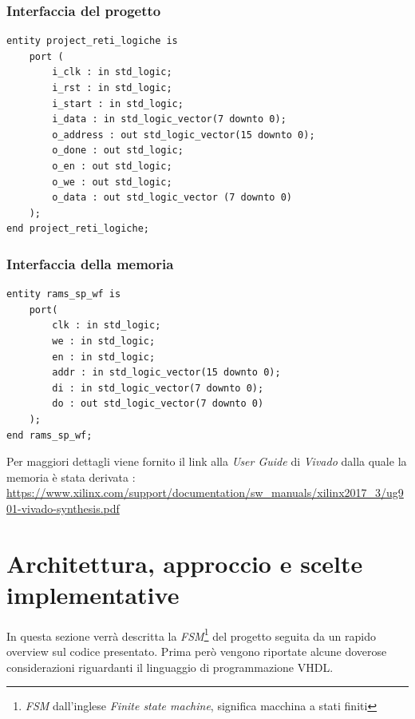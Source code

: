 \documentclass[11pt,a4paper]{article}
\begin{document}
        \subsubsection{Interfaccia del progetto}
            \begin{verbatim}
entity project_reti_logiche is
    port (
        i_clk : in std_logic;
        i_rst : in std_logic;
        i_start : in std_logic;
        i_data : in std_logic_vector(7 downto 0);
        o_address : out std_logic_vector(15 downto 0);
        o_done : out std_logic;
        o_en : out std_logic;
        o_we : out std_logic;
        o_data : out std_logic_vector (7 downto 0)
    );
end project_reti_logiche;
            \end{verbatim}
        \newpage
        \subsubsection{Interfaccia della memoria}
            \begin{verbatim}
entity rams_sp_wf is
    port(
        clk : in std_logic;
        we : in std_logic;
        en : in std_logic;
        addr : in std_logic_vector(15 downto 0);
        di : in std_logic_vector(7 downto 0);
        do : out std_logic_vector(7 downto 0)
    );
end rams_sp_wf;
            \end{verbatim}
            Per maggiori dettagli viene fornito il link alla \textit{User Guide} di \textit{Vivado} dalla quale la memoria è stata derivata : \footnotesize{\url{https://www.xilinx.com/support/documentation/sw\_manuals/xilinx2017\_3/ug901-vivado-synthesis.pdf}}
    \section{Architettura, approccio e scelte implementative}
        In questa sezione verrà descritta la \textit{FSM}\footnote[1]{\textit{FSM} dall'inglese \textit{Finite state machine}, significa macchina a stati finiti} del progetto seguita da un rapido overview sul codice presentato. Prima però vengono riportate alcune doverose considerazioni
        riguardanti il linguaggio di programmazione VHDL.
\end{document}
